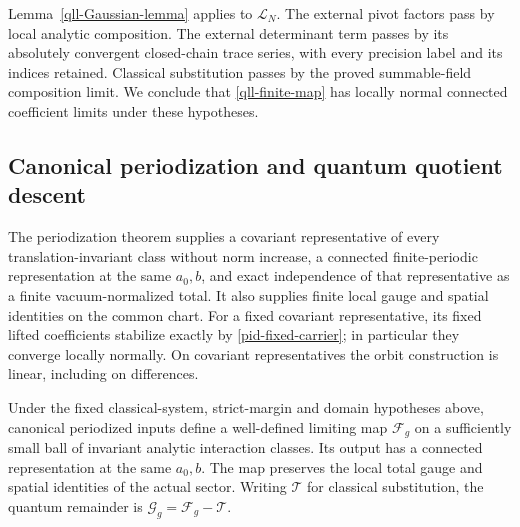 Lemma~\ref{qll-Gaussian-lemma} applies to \(\mathcal L_N\).
The external pivot factors pass by local analytic composition.
The external determinant term passes by its absolutely
convergent closed-chain trace series, with every precision
label and its indices retained. Classical substitution passes
by the proved summable-field composition limit. We conclude
that \eqref{qll-finite-map} has locally normal connected
coefficient limits under these hypotheses.

\subsection{Canonical periodization and quantum quotient descent}
\label{qll-descent-section}

The periodization theorem supplies a covariant representative
of every translation-invariant class without norm increase,
a connected finite-periodic representation at the same
\(a_0,b\), and exact independence of that representative as
a finite vacuum-normalized total. It also supplies finite
local gauge and spatial identities on the common chart.
For a fixed covariant representative, its fixed lifted
coefficients stabilize exactly by
\eqref{pid-fixed-carrier}; in particular they converge locally
normally. On covariant representatives the orbit construction
is linear, including on differences.

\begin{theorem}
\label{qll-descent-theorem}
Under the fixed classical-system, strict-margin and domain
hypotheses above, canonical periodized inputs define a
well-defined limiting map \(\mathcal F_g\) on a sufficiently
small ball of invariant analytic interaction classes.
Its output has a connected representation at the same
\(a_0,b\). The map preserves the local total gauge and spatial
identities of the actual sector. Writing \(\mathcal T\) for
classical substitution, the quantum remainder is
\(\mathcal G_g=\mathcal F_g-\mathcal T\).
\end{theorem}

